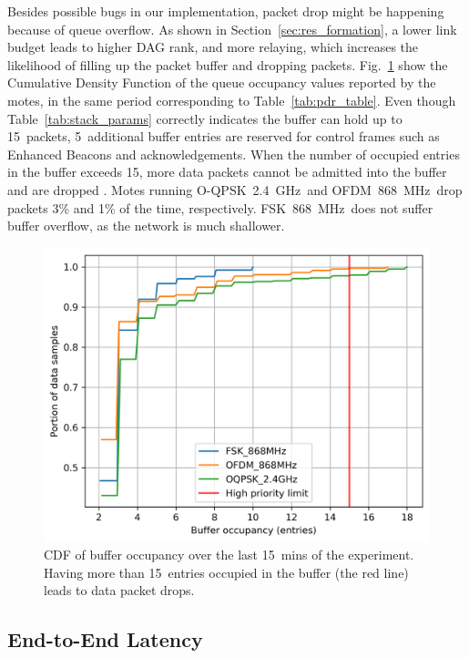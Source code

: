 \documentclass[sensors,article,submit,moreauthors,pdftex]{Definitions/mdpi}
\newcommand{\fsk}           {FSK~868~MHz}
\newcommand{\oqpsk}         {O-QPSK~2.4~GHz}
\newcommand{\ofdm}          {OFDM~868~MHz}
\newcommand{\figwidth}      {0.80}
\begin{document}

Besides possible bugs in our implementation, packet drop might be happening because of queue overflow.
As shown in Section~\ref{sec:res_formation}, a lower link budget leads to higher DAG rank, and more relaying, which increases the likelihood of filling up the packet buffer and dropping packets.
Fig.~\ref{fig:maxBufferSize_cdf_plot_full_steady_15} show the Cumulative Density Function of the queue occupancy values reported by the motes, in the same period corresponding to Table~\ref{tab:pdr_table}.
Even though Table~\ref{tab:stack_params} correctly indicates the buffer can hold up to 15~packets, 5~additional buffer entries are reserved for control frames such as Enhanced Beacons and acknowledgements.
When the number of occupied entries in the buffer exceeds 15, more data packets cannot be admitted into the buffer and are dropped .
Motes running \oqpsk\ and \ofdm\ drop packets 3\% and 1\% of the time, respectively.
\fsk\ does not suffer buffer overflow, as the network is much shallower.

\begin{figure}
	\centering
	\includegraphics[width=\figwidth\columnwidth]{maxBufferSize_cdf_plot_full_steady_15}
	\caption{CDF of buffer occupancy over the last 15~mins of the experiment. Having more than 15~entries occupied in the buffer (the red line) leads to data packet drops.}
    \label{fig:maxBufferSize_cdf_plot_full_steady_15}
\end{figure}

\subsection{End-to-End Latency}
\label{sec:res_latency}
\end{document}
